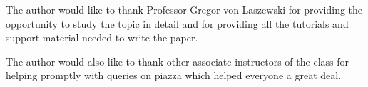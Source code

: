 \documentclass[sigconf]{acmart}
\begin{document}
\begin{acks}
The author would like to thank Professor Gregor von Laszewski for providing the opportunity to study the topic in detail and for providing all the tutorials and support material needed to write the paper.

The author would also like to thank other associate instructors of the class for helping promptly with queries on piazza which helped everyone a great deal.
\end{acks}


 
\end{document}

